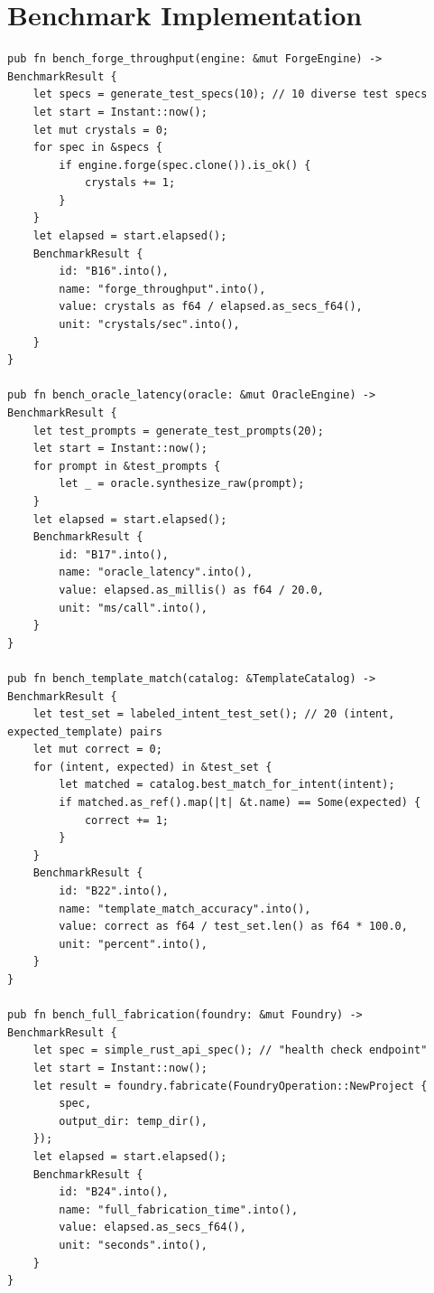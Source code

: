 \documentclass[11pt,a4paper,twoside]{article}
\theoremstyle{definition}
\theoremstyle{plain}
\theoremstyle{remark}
\begin{document}
\section{Benchmark Implementation}\label{sec:benchimpl}

\begin{lstlisting}[title={New benchmark functions in isls-harness}]
pub fn bench_forge_throughput(engine: &mut ForgeEngine) -> BenchmarkResult {
    let specs = generate_test_specs(10); // 10 diverse test specs
    let start = Instant::now();
    let mut crystals = 0;
    for spec in &specs {
        if engine.forge(spec.clone()).is_ok() {
            crystals += 1;
        }
    }
    let elapsed = start.elapsed();
    BenchmarkResult {
        id: "B16".into(),
        name: "forge_throughput".into(),
        value: crystals as f64 / elapsed.as_secs_f64(),
        unit: "crystals/sec".into(),
    }
}

pub fn bench_oracle_latency(oracle: &mut OracleEngine) -> BenchmarkResult {
    let test_prompts = generate_test_prompts(20);
    let start = Instant::now();
    for prompt in &test_prompts {
        let _ = oracle.synthesize_raw(prompt);
    }
    let elapsed = start.elapsed();
    BenchmarkResult {
        id: "B17".into(),
        name: "oracle_latency".into(),
        value: elapsed.as_millis() as f64 / 20.0,
        unit: "ms/call".into(),
    }
}

pub fn bench_template_match(catalog: &TemplateCatalog) -> BenchmarkResult {
    let test_set = labeled_intent_test_set(); // 20 (intent, expected_template) pairs
    let mut correct = 0;
    for (intent, expected) in &test_set {
        let matched = catalog.best_match_for_intent(intent);
        if matched.as_ref().map(|t| &t.name) == Some(expected) {
            correct += 1;
        }
    }
    BenchmarkResult {
        id: "B22".into(),
        name: "template_match_accuracy".into(),
        value: correct as f64 / test_set.len() as f64 * 100.0,
        unit: "percent".into(),
    }
}

pub fn bench_full_fabrication(foundry: &mut Foundry) -> BenchmarkResult {
    let spec = simple_rust_api_spec(); // "health check endpoint"
    let start = Instant::now();
    let result = foundry.fabricate(FoundryOperation::NewProject {
        spec,
        output_dir: temp_dir(),
    });
    let elapsed = start.elapsed();
    BenchmarkResult {
        id: "B24".into(),
        name: "full_fabrication_time".into(),
        value: elapsed.as_secs_f64(),
        unit: "seconds".into(),
    }
}
\end{lstlisting}
\end{document}
